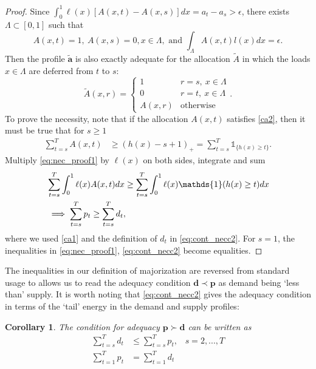 \documentclass[10pt,draftcls,onecolumn]{IEEEtran}
\newtheorem{corollary}{Corollary}
\let \VEC \mathbf
\def\ind{{\mathds{1}}}
\let \lessthan \prec
\let \morethan \succ
\newcounter{l1}
\newcounter{l2}
\newcounter{l3}
\begin{document}
\begin{proof}
Since $\int_0^1 \ell(x) [A(x,t)-A(x,s)] dx = a_t - a_s > \epsilon$, there exists $\Lambda \subset [0,1]$ such that 
\[ A(x,t) =1, \ A(x,s) = 0, x \in \Lambda , \mbox{ and } \int_{\Lambda} A(x,t) l(x) dx = \epsilon.\]
Then the profile $\VEC{\tilde{a}}$ is also exactly adequate for the allocation $\tilde{A}$ in which the loads $x \in \Lambda$ are deferred from $t$ to $s$:
 \begin{equation} 
\tilde{A}(x,r) = \left\{
\begin{array}{ll}
1 & r=s, ~x\in \Lambda\\
0 & r=t,~ x \in \Lambda \\
A(x,r) & \mathrm{otherwise} \end{array}
\right. .
\end{equation}
To prove the necessity, note that if the allocation  $A(x,t)$ satisfies \eqref{ca2}, then it must be true that for $s \geq 1$
\begin{align}
\sum_{t=s}^T A(x,t) &\geq (h(x)-s+1)_+ 
=\sum_{t=s}^T \ind_{\{h(x) \geq t\}} .\label{eq:nec_proof1}
\end{align}
Multiply  \eqref{eq:nec_proof1} by $\ell(x)$ on both sides, integrate and sum
\begin{align}
& \sum_{t=s}^T \int_0^1 \ell(x)A(x,t)dx \geq \sum_{t=s}^T\int_0^1 \ell(x)\ind(h(x) \geq t)dx  \notag \\
 &\implies \sum_{t=s}^T p_t \geq \sum_{t=s}^T d_t, \label{eq:cont_necc2}
\end{align}
where we used \eqref{ca1} and the definition of $d_t$ in \eqref{eq:cont_necc2}. For $s=1$, the inequalities in \eqref{eq:nec_proof1}, \eqref{eq:cont_necc2} become equalities. 
\end{proof}



 The inequalities in our definition of majorization are reversed from standard usage to allows us to read the adequacy condition
 $\VEC d \lessthan \VEC p$  as demand being `less than' supply.
It is worth noting that \eqref{eq:cont_necc2} gives the adequacy condition in terms of  the `tail' energy in the demand and supply profiles:
\begin{corollary}\label{cor:cont_adequacy}
The condition for adequacy $\VEC p \morethan \VEC d$ can be written as
\begin{align}
\sum_{t=s}^T d_t &\leq \sum_{t=s}^T p_t,\;\;\;s=2,...,T\\
\sum_{t=1}^T p_t &= \sum_{t=1}^T d_t
\end{align}
\end{corollary}
\end{document}
